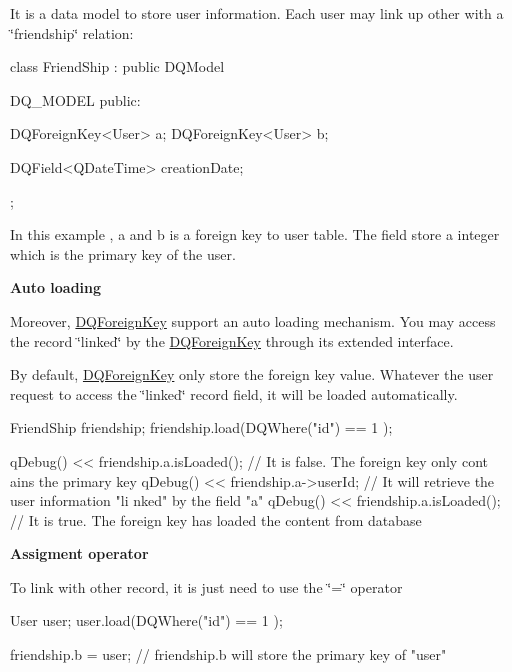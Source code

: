 It is a data model to store user information. Each user may link up other with a \char`\"{}friendship\char`\"{} relation:


\begin{DoxyCode}

class FriendShip : public DQModel {
    DQ_MODEL
public:

    DQForeignKey<User> a;
    DQForeignKey<User> b;

    DQField<QDateTime> creationDate;

};
\end{DoxyCode}


In this example , a and b is a foreign key to user table. The field store a integer which is the primary key of the user.

{\bfseries  Auto loading }

Moreover, \hyperlink{classDQForeignKey}{DQForeignKey} support an auto loading mechanism. You may access the record \char`\"{}linked\char`\"{} by the \hyperlink{classDQForeignKey}{DQForeignKey} through its extended interface.

By default, \hyperlink{classDQForeignKey}{DQForeignKey} only store the foreign key value. Whatever the user request to access the \char`\"{}linked\char`\"{} record field, it will be loaded automatically.


\begin{DoxyCode}
   FriendShip friendship;
   friendship.load(DQWhere("id") == 1 );

   qDebug() << friendship.a.isLoaded(); // It is false. The foreign key only cont
      ains the primary key
   qDebug() << friendship.a->userId; // It will retrieve the user information "li
      nked" by the field "a"
   qDebug() << friendship.a.isLoaded(); // It is true. The foreign key has loaded
       the content from database
\end{DoxyCode}


{\bfseries Assigment operator}

To link with other record, it is just need to use the \char`\"{}=\char`\"{} operator 
\begin{DoxyCode}
    User user;
    user.load(DQWhere("id") == 1 );

    friendship.b = user; // friendship.b will store the primary key of "user"
\end{DoxyCode}
 

